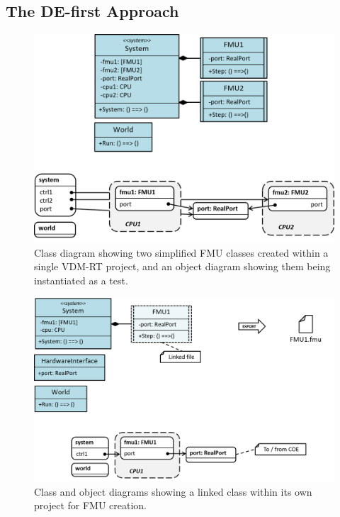 
\subsection{The DE-first Approach}

\begin{figure}[p]
\centering
\includegraphics[scale=0.47]{figures/defirst_class}
\caption{Class diagram showing two simplified FMU classes created within a single VDM-RT project, and an object diagram showing them being instantiated as a test.}
\label{fig:defist_class}
\end{figure}

\begin{figure}[p]
\centering
\includegraphics[scale=0.47]{figures/defirst_fmu1}
\caption{Class and object diagrams showing a linked class within its own project for FMU creation.}
\label{fig:defirst_fmus}
\end{figure}

